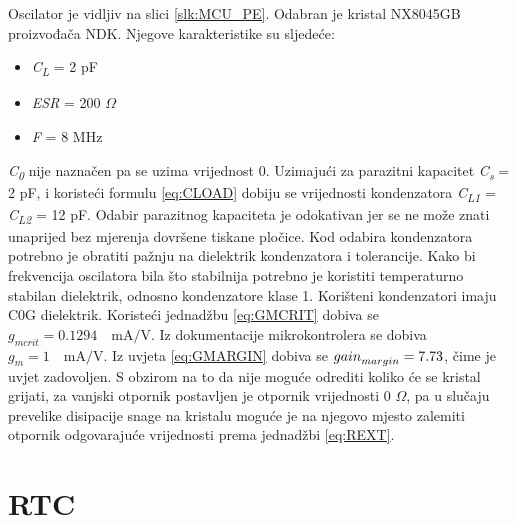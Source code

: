 Oscilator je vidljiv na slici \ref{slk:MCU_PE}. Odabran je kristal NX8045GB proizvođača NDK. Njegove karakteristike su sljedeće:
\begin{itemize}
    \item \textit{C\textsubscript{L}} = 2 pF
    \item \textit{ESR} = 200 $\Omega$
    \item \textit{F} = 8 MHz
\end{itemize}
\textit{C\textsubscript{0}} nije naznačen pa se uzima vrijednost 0. Uzimajući za parazitni kapacitet \textit{C\textsubscript{s}} = 2 pF, i koristeći formulu \ref{eq:CLOAD} dobiju se vrijednosti kondenzatora \textit{C\textsubscript{L1}} = \textit{C\textsubscript{L2}} = 12 pF. Odabir parazitnog kapaciteta je odokativan jer se ne može znati unaprijed bez mjerenja dovršene tiskane pločice. Kod odabira kondenzatora potrebno je obratiti pažnju na dielektrik kondenzatora i tolerancije. Kako bi frekvencija oscilatora bila što stabilnija potrebno je koristiti temperaturno stabilan dielektrik, odnosno kondenzatore klase 1. Korišteni kondenzatori imaju C0G dielektrik. Koristeći jednadžbu \ref{eq:GMCRIT} dobiva se ${g_{mcrit} = 0.1294 \quad \textrm{mA/V}}$. Iz dokumentacije mikrokontrolera se dobiva ${g_m = 1\quad \textrm{mA/V}}$. Iz uvjeta \ref{eq:GMARGIN} dobiva se ${{gain}_{margin}=\nolinebreak 7.73}$, čime je uvjet zadovoljen. S obzirom na to da nije moguće odrediti koliko će se kristal grijati, za vanjski otpornik postavljen je otpornik vrijednosti 0 $\Omega$, pa u slučaju prevelike disipacije snage na kristalu moguće je na njegovo mjesto zalemiti otpornik odgovarajuće vrijednosti prema jednadžbi \ref{eq:REXT}.

\section{RTC}

